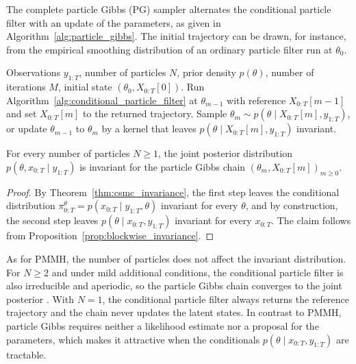 The complete particle Gibbs (PG) sampler \cite{andrieu2010particle} alternates the conditional particle filter with an update of the parameters, as given in Algorithm~\ref{alg:particle_gibbs}. The initial trajectory can be drawn, for instance, from the empirical smoothing distribution of an ordinary particle filter run at $\theta_0$.

\begin{algorithm}[H]
\caption{Particle Gibbs}
\label{alg:particle_gibbs}
\begin{algorithmic}[1]
    \REQUIRE Observations $y_{1:T}$, number of particles $N$, prior density $p(\theta)$, number of iterations $M$, initial state $(\theta_0,X_{0:T}[0])$.
        \STATE Run Algorithm~\ref{alg:conditional_particle_filter} at $\theta_{m-1}$ with reference $X_{0:T}[m-1]$ and set $X_{0:T}[m]$ to the returned trajectory.
        \STATE Sample $\theta_m\sim p(\theta\mid X_{0:T}[m],y_{1:T})$, or update $\theta_{m-1}$ to $\theta_m$ by a kernel that leaves $p(\theta\mid X_{0:T}[m],y_{1:T})$ invariant.
    \ENDFOR
\end{algorithmic}
\end{algorithm}

\begin{theorem}
    \label{thm:pg_invariance}
    For every number of particles $N\ge1$, the joint posterior distribution $p(\theta,x_{0:T}\mid y_{1:T})$ is invariant for the particle Gibbs chain $(\theta_m,X_{0:T}[m])_{m\ge0}$.
\end{theorem}
\begin{proof}
    By Theorem~\ref{thm:csmc_invariance}, the first step leaves the conditional distribution $\pi_{0:T}^\theta = p(x_{0:T}\mid y_{1:T},\theta)$ invariant for every $\theta$, and by construction, the second step leaves $p(\theta\mid x_{0:T},y_{1:T})$ invariant for every $x_{0:T}$. The claim follows from Proposition~\ref{prop:blockwise_invariance}.
\end{proof}

As for PMMH, the number of particles does not affect the invariant distribution. For $N\ge2$ and under mild additional conditions, the conditional particle filter is also irreducible and aperiodic, so the particle Gibbs chain converges to the joint posterior \cite{andrieu2010particle}. With $N=1$, the conditional particle filter always returns the reference trajectory and the chain never updates the latent states. In contrast to PMMH, particle Gibbs requires neither a likelihood estimate nor a proposal for the parameters, which makes it attractive when the conditionals $p(\theta\mid x_{0:T},y_{1:T})$ are tractable.

